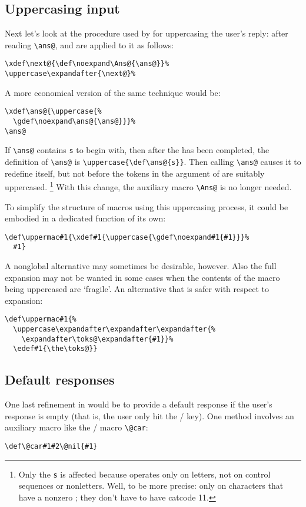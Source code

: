 {\subsection{Uppercasing input}

Next let's look at the procedure used by  for
uppercasing the user's reply: after reading \verb|\ans@|, 
and  are applied to it as follows:
 \begin{verbatim}
\xdef\next@{\def\noexpand\Ans@{\ans@}}%
\uppercase\expandafter{\next@}%
\end{verbatim}
 A more economical version of the same technique would be:
 \begin{verbatim}
\xdef\ans@{\uppercase{%
  \gdef\noexpand\ans@{\ans@}}}%
\ans@
\end{verbatim}
 If \verb|\ans@| contains \verb|s|
to begin with, then after the  has been completed, the
definition of \verb|\ans@| is \verb|\uppercase{\def\ans@{s}}|.  Then calling
\verb|\ans@| causes it to redefine itself, but not before the tokens in the
argument of  are suitably uppercased.%
\footnote{Only the \verb|s| is
affected because  operates only on letters, not
on control sequences or nonletters. Well, to be more precise: only on
characters that have a nonzero ; they don't have to have
catcode 11.}
With this change, the auxiliary macro \verb|\Ans@| is no longer needed.

To simplify the structure of macros using this uppercasing process,
it could be embodied in a dedicated function of its own:
\begin{verbatim}
\def\uppermac#1{\xdef#1{\uppercase{\gdef\noexpand#1{#1}}}%
  #1}
\end{verbatim}

A nonglobal alternative may sometimes be desirable, however.
Also the full expansion may not be wanted in some cases when
the contents of the macro being uppercased are `fragile'.
An alternative that is safer with respect to expansion:
\begin{verbatim}
\def\uppermac#1{%
  \uppercase\expandafter\expandafter\expandafter{%
    \expandafter\toks@\expandafter{#1}}%
  \edef#1{\the\toks@}}
\end{verbatim}

\subsection{Default responses}
One \label{s:defaults}
last refinement in  would be to provide
a default response if the user's response is empty (that is,
the user only hit
the \return/ key). One method involves an auxiliary
macro like the \latex/ macro \verb|\@car|:
 \begin{verbatim}
\def\@car#1#2\@nil{#1}
\end{verbatim}

}
